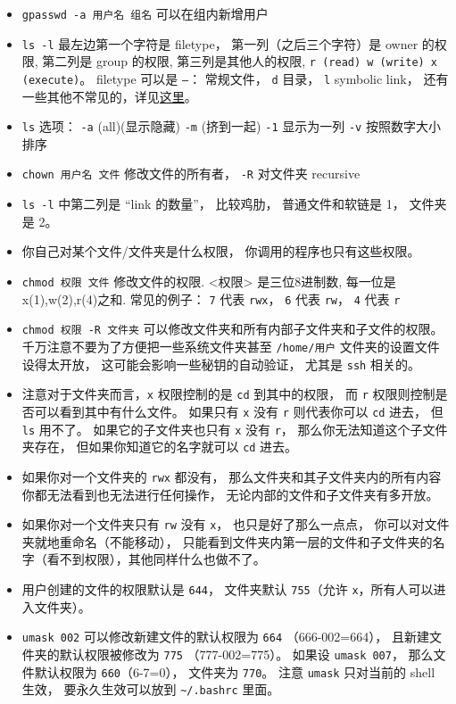 \begin{itemize}
\item \verb`gpasswd -a 用户名 组名` 可以在组内新增用户
\item \verb`ls -l` 最左边第一个字符是 filetype， 第一列（之后三个字符）是 owner 的权限, 第二列是 group 的权限, 第三列是其他人的权限, \verb`r (read) w (write) x (execute)`。 filetype 可以是 \verb|–|： 常规文件， \verb|d| 目录， \verb|l| symbolic link， 还有一些其他不常见的，详见\href{https://linuxconfig.org/identifying-file-types-in-linux}{这里}。
\item \verb`ls` 选项： \verb`-a` (all)(显示隐藏) \verb`-m` (挤到一起) \verb`-1` 显示为一列 \verb`-v` 按照数字大小排序
\item \verb`chown 用户名 文件` 修改文件的所有者， \verb|-R| 对文件夹 recursive
\item \verb|ls -l| 中第二列是 “link 的数量”， 比较鸡肋， 普通文件和软链是 1， 文件夹是 2。
\item 你自己对某个文件/文件夹是什么权限， 你调用的程序也只有这些权限。
\item \verb`chmod 权限 文件` 修改文件的权限. <权限> 是三位8进制数, 每一位是 x(1),w(2),r(4)之和. 常见的例子： \verb|7| 代表 \verb|rwx|， \verb|6| 代表 \verb|rw|， \verb|4| 代表 \verb|r|
\item \verb`chmod 权限 -R 文件夹` 可以修改文件夹和所有内部子文件夹和子文件的权限。 千万注意不要为了方便把一些系统文件夹甚至 \verb|/home/用户| 文件夹的设置文件设得太开放， 这可能会影响一些秘钥的自动验证， 尤其是 \verb|ssh| 相关的。
\item 注意对于文件夹而言，\verb|x| 权限控制的是 \verb|cd| 到其中的权限， 而 \verb|r| 权限则控制是否可以看到其中有什么文件。 如果只有 \verb|x| 没有 \verb|r| 则代表你可以 \verb|cd| 进去， 但 \verb|ls| 用不了。 如果它的子文件夹也只有 \verb|x| 没有 \verb|r|， 那么你无法知道这个子文件夹存在， 但如果你知道它的名字就可以 \verb|cd| 进去。
\item 如果你对一个文件夹的 \verb|rwx| 都没有， 那么文件夹和其子文件夹内的所有内容你都无法看到也无法进行任何操作， 无论内部的文件和子文件夹有多开放。
\item 如果你对一个文件夹只有 \verb|rw| 没有 \verb|x|， 也只是好了那么一点点， 你可以对文件夹就地重命名（不能移动）， 只能看到文件夹内第一层的文件和子文件夹的名字（看不到权限），其他同样什么也做不了。
\item 用户创建的文件的权限默认是 \verb|644|， 文件夹默认 \verb|755|（允许 \verb|x|，所有人可以进入文件夹）。
\item \verb|umask 002| 可以修改新建文件的默认权限为 \verb|664| （666-002=664）， 且新建文件夹的默认权限被修改为 \verb|775| （777-002=775）。 如果设 \verb|umask 007|， 那么文件默认权限为 \verb|660|（6-7=0）， 文件夹为 \verb|770|。 注意 \verb|umask| 只对当前的 shell 生效， 要永久生效可以放到 \verb|~/.bashrc| 里面。

\end{itemize}
